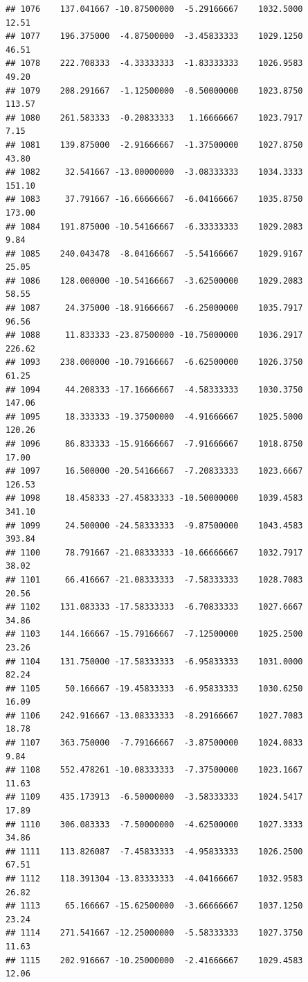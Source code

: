 \documentclass[
]{article}
\begin{document}
\begin{verbatim}
## 1076    137.041667 -10.87500000  -5.29166667    1032.5000       12.51
## 1077    196.375000  -4.87500000  -3.45833333    1029.1250       46.51
## 1078    222.708333  -4.33333333  -1.83333333    1026.9583       49.20
## 1079    208.291667  -1.12500000  -0.50000000    1023.8750      113.57
## 1080    261.583333  -0.20833333   1.16666667    1023.7917        7.15
## 1081    139.875000  -2.91666667  -1.37500000    1027.8750       43.80
## 1082     32.541667 -13.00000000  -3.08333333    1034.3333      151.10
## 1083     37.791667 -16.66666667  -6.04166667    1035.8750      173.00
## 1084    191.875000 -10.54166667  -6.33333333    1029.2083        9.84
## 1085    240.043478  -8.04166667  -5.54166667    1029.9167       25.05
## 1086    128.000000 -10.54166667  -3.62500000    1029.2083       58.55
## 1087     24.375000 -18.91666667  -6.25000000    1035.7917       96.56
## 1088     11.833333 -23.87500000 -10.75000000    1036.2917      226.62
## 1093    238.000000 -10.79166667  -6.62500000    1026.3750       61.25
## 1094     44.208333 -17.16666667  -4.58333333    1030.3750      147.06
## 1095     18.333333 -19.37500000  -4.91666667    1025.5000      120.26
## 1096     86.833333 -15.91666667  -7.91666667    1018.8750       17.00
## 1097     16.500000 -20.54166667  -7.20833333    1023.6667      126.53
## 1098     18.458333 -27.45833333 -10.50000000    1039.4583      341.10
## 1099     24.500000 -24.58333333  -9.87500000    1043.4583      393.84
## 1100     78.791667 -21.08333333 -10.66666667    1032.7917       38.02
## 1101     66.416667 -21.08333333  -7.58333333    1028.7083       20.56
## 1102    131.083333 -17.58333333  -6.70833333    1027.6667       34.86
## 1103    144.166667 -15.79166667  -7.12500000    1025.2500       23.26
## 1104    131.750000 -17.58333333  -6.95833333    1031.0000       82.24
## 1105     50.166667 -19.45833333  -6.95833333    1030.6250       16.09
## 1106    242.916667 -13.08333333  -8.29166667    1027.7083       18.78
## 1107    363.750000  -7.79166667  -3.87500000    1024.0833        9.84
## 1108    552.478261 -10.08333333  -7.37500000    1023.1667       11.63
## 1109    435.173913  -6.50000000  -3.58333333    1024.5417       17.89
## 1110    306.083333  -7.50000000  -4.62500000    1027.3333       34.86
## 1111    113.826087  -7.45833333  -4.95833333    1026.2500       67.51
## 1112    118.391304 -13.83333333  -4.04166667    1032.9583       26.82
## 1113     65.166667 -15.62500000  -3.66666667    1037.1250       23.24
## 1114    271.541667 -12.25000000  -5.58333333    1027.3750       11.63
## 1115    202.916667 -10.25000000  -2.41666667    1029.4583       12.06

\end{verbatim}
\end{document}
